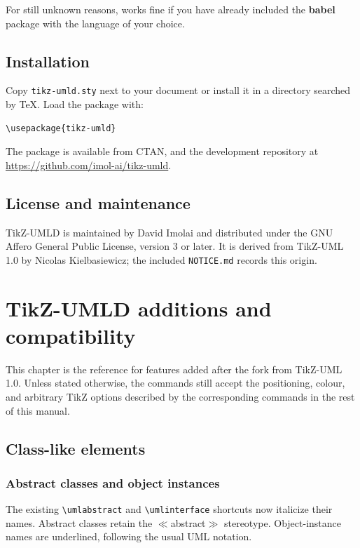 \documentclass[a4paper,11pt]{report}
\begin{document}
For still unknown reasons, \tuml works fine if you have already included the {\bf babel} package with the language of your choice.

\section{Installation}

Copy \texttt{tikz-umld.sty} next to your document or install it in a directory
searched by TeX. Load the package with:

\begin{lstlisting}
\usepackage{tikz-umld}
\end{lstlisting}

The package is available from CTAN, and the development repository at
\url{https://github.com/imol-ai/tikz-umld}.

\section{License and maintenance}

TikZ-UMLD is maintained by David Imolai and distributed under the GNU Affero
General Public License, version 3 or later. It is derived from TikZ-UML 1.0 by
Nicolas Kielbasiewicz; the included \texttt{NOTICE.md} records this origin.

\chapter{TikZ-UMLD additions and compatibility}\label{c.umld}

This chapter is the reference for features added after the fork from TikZ-UML
1.0. Unless stated otherwise, the commands still accept the positioning,
colour, and arbitrary TikZ options described by the corresponding commands in
the rest of this manual.

\section{Class-like elements}

\subsection{Abstract classes and object instances}

The existing \lstinline!\umlabstract! and \lstinline!\umlinterface! shortcuts
now italicize their names. Abstract classes retain the
$\ll$abstract$\gg$ stereotype. Object-instance names are underlined, following
the usual UML notation.
\end{document}
